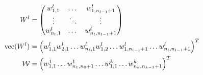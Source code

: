 \documentclass[draft]{article}
\DeclareMathOperator{\vect}{vec}
\begin{document}
\begin{align}
W^l &= \begin{pmatrix}
w^l_{1,1} & \dots & w^l_{1,n_{l-1}+1} \\
\vdots & \ddots & \vdots \\
w^l_{n_{l},1} & \dots & w^l_{n_{l},n_{l-1}+1}
\end{pmatrix} \\
\vect(W^l) &= \Bigl( w^l_{1,1} w^l_{2,1} \dots w^l_{n_{l},1} w^l_{1,2} \dots w^l_{1,n_{l-1}+1} \dots w^l_{n_{l},n_{l-1}+1}\Bigr)^T \\
\mathcal{W} &= \Bigl( w^1_{1,1} \dots w^1_{n_1,n_0+1} \dots  w^k_{1,1} \dots w^k_{n_k,n_{k-1}+1} \Bigr)^T
\end{align}
\end{document}
